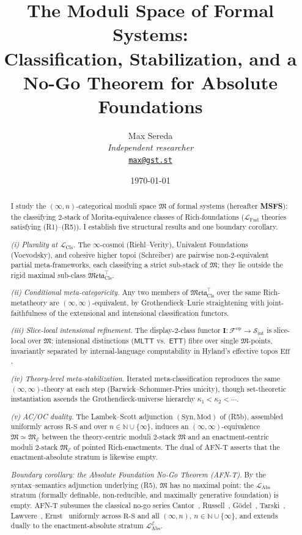 \documentclass[11pt]{article}
\title{The Moduli Space of Formal Systems:\\
Classification, Stabilization, and a No-Go Theorem for Absolute Foundations}
\author{%
  \footnotesize Max Sereda \\[-3pt]
  \scriptsize\textit{Independent researcher} \\[-3pt]
  \scriptsize\texttt{\href{mailto:max@gst.st}{max@gst.st}}%
}
\date{\scriptsize\today}
\theoremstyle{plain}
\theoremstyle{definition}
\newcommand{\RS}{\mathrm{R\text{-}S}}
\newcommand{\cS}{\mathcal{S}}
\newcommand{\cF}{\mathcal{F}}
\newcommand{\fM}{\mathfrak{M}}
\newcommand{\Meta}{\mathfrak{Meta}}
\newcommand{\LFnd}{\mathcal{L}_{\mathrm{Fnd}}}
\newcommand{\LCls}{\mathcal{L}_{\mathrm{Cls}}}
\newcommand{\LAbs}{\mathcal{L}_{\mathrm{Abs}}}
\newcommand{\Sint}{\cS_{\mathrm{int}}}
\newcommand{\Syn}{\mathrm{Syn}}
\newcommand{\Mod}{\mathrm{Mod}}
\newcommand{\MLTT}{\mathsf{MLTT}}
\newcommand{\ETT}{\mathsf{ETT}}
\newcommand{\II}{\mathbf{I}}
\newcommand{\cE}{\mathcal{E}}
\begin{document}
\maketitle

\begin{abstract}
I study the $(\infty, n)$-categorical moduli space $\fM$ of formal systems (hereafter \textbf{MSFS}): the classifying $2$-stack of Morita-equivalence classes of Rich-foundations ($\LFnd$ theories satisfying (R1)--(R5)). I establish five structural results and one boundary corollary.

\emph{(i) Plurality at $\LCls$.} The $\infty$-cosmoi (Riehl--Verity), Univalent Foundations (Voevodsky), and cohesive higher topoi (Schreiber) are pairwise non-$2$-equivalent partial meta-frameworks, each classifying a strict sub-stack of $\fM$; they lie outside the rigid maximal sub-class $\Meta_{\mathrm{Cls}}^{\top}$.

\emph{(ii) Conditional meta-categoricity.} Any two members of $\Meta_{\mathrm{Cls}}^{\top}$ over the same Rich-metatheory are $(\infty, \infty)$-equivalent, by Grothendieck--Lurie straightening with joint-faithfulness of the extensional and intensional classification functors.

\emph{(iii) Slice-local intensional refinement.} The display-$2$-class functor $\II : \cF^{\mathrm{op}} \to \Sint$ is slice-local over $\fM$: intensional distinctions ($\MLTT$ vs.\ $\ETT$) fibre over single $\fM$-points, invariantly separated by internal-language computability in Hyland's effective topos $\mathrm{Eff}$.

\emph{(iv) Theory-level meta-stabilization.} Iterated meta-classification reproduces the same $(\infty, \infty)$-theory at each step (Barwick--Schommer-Pries unicity), though set-theoretic instantiation ascends the Grothendieck-universe hierarchy $\kappa_1 < \kappa_2 < \cdots$.

\emph{(v) AC/OC duality.} The Lambek--Scott adjunction $(\Syn, \Mod)$ of (R5b), assembled uniformly across $\RS$ and over $n \in \mathbb{N} \cup \{\infty\}$, induces an $(\infty, \infty)$-equivalence $\fM \simeq \fM_\cE$ between the theory-centric moduli $2$-stack $\fM$ and an enactment-centric moduli $2$-stack $\fM_\cE$ of pointed Rich-enactments. The dual of AFN-T asserts that the enactment-absolute stratum is likewise empty.

\emph{Boundary corollary: the Absolute Foundation No-Go Theorem (AFN-T).} By the syntax--semantics adjunction underlying (R5), $\fM$ has no maximal point: the $\LAbs$ stratum (formally definable, non-reducible, and maximally generative foundation) is empty. AFN-T subsumes the classical no-go series Cantor~\cite{Cantor1891}, Russell~\cite{Russell1903}, G\"odel~\cite{Godel1931}, Tarski~\cite{Tarski1936}, Lawvere~\cite{Lawvere1969}, Ernst~\cite{Ernst2015} uniformly across $\RS$ and all $(\infty, n)$, $n \in \mathbb{N} \cup \{\infty\}$, and extends dually to the enactment-absolute stratum $\LAbs^\cE$.


\end{abstract}
\end{document}
